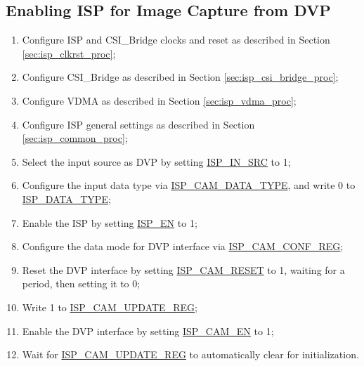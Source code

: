 \documentclass[main\_\_EN.tex]{subfiles}
\begin{document}
\subsection{Enabling ISP for Image Capture from DVP}
\begin{enumerate}
    \item Configure ISP and CSI\_Bridge clocks and reset as described in Section \ref{sec:isp_clkrst_proc};

    \item Configure CSI\_Bridge as described in Section \ref{sec:isp_csi_bridge_proc};

    \item Configure VDMA as described in Section \ref{sec:isp_vdma_proc};

    \item Configure ISP general settings as described in Section \ref{sec:isp_common_proc};

    \item Select the input source as DVP by setting \hyperref[fielddesc:ISPINSRC]{ISP\_IN\_SRC} to 1;

    \item Configure the input data type via \hyperref[fielddesc:ISPCAMDATATYPE]{ISP\_CAM\_DATA\_TYPE}, and write 0 to \hyperref[fielddesc:ISPDATATYPE]{ISP\_DATA\_TYPE};

    \item Enable the ISP by setting \hyperref[fielddesc:ISPEN]{ISP\_EN} to 1;

    \item Configure the data mode for DVP interface via \hyperref[regdesc:ISPCAMCONFREG]{ISP\_CAM\_CONF\_REG};

    \item Reset the DVP interface by setting \hyperref[fielddesc:ISPCAMRESET]{ISP\_CAM\_RESET} to 1, waiting for a period, then setting it to 0;

    \item Write 1 to \hyperref[fielddesc:ISPCAMUPDATEREG]{ISP\_CAM\_UPDATE\_REG};

    \item Enable the DVP interface by setting \hyperref[fielddesc:ISPCAMEN]{ISP\_CAM\_EN} to 1;

    \item Wait for \hyperref[fielddesc:ISPCAMUPDATEREG]{ISP\_CAM\_UPDATE\_REG} to automatically clear for initialization.
\end{enumerate}
\end{document}
